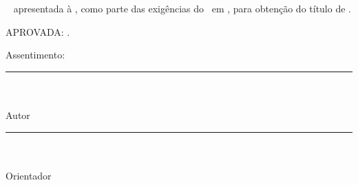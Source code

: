 \newpage
\thispagestyle{empty}
\begin{spacing}{1}
\begin{center}
{\MakeUppercase{\nome} \\ }

\vspace*{4.2cm}
{\MakeUppercase{\textbf{\titulo}} \\ }
\end{center}

\vspace*{2.6cm}
\singlespacing
\begin{flushright}
\begin{minipage}{225pt}
\fontcapa
{\tipo~ apresentada à \instituicao, como parte
  das exigências do \programa~em \curso, para
  obtenção do título de \textit{\titulop}.
} 

\end{minipage}
\end{flushright}
\vspace*{1.3cm}
%
%
APROVADA: \aprovacao.
\vspace*{2.15cm}
\begin{flushleft}
Assentimento:
\end{flushleft}
\vspace*{2.15cm}
\begin{center}
\begin{minipage}{8.5cm}
{\begin{center}
\rule{\linewidth}{0.1mm} \\
{\nome}\\%
Autor
\end{center}
}

\end{minipage}
\vfill
\begin{minipage}{8.5cm}
{\begin{center}
\rule{\linewidth}{0.1mm} \\
{\orientador}\\%
Orientador
\end{center}}
\end{minipage}
\end{center}

\end{spacing}
